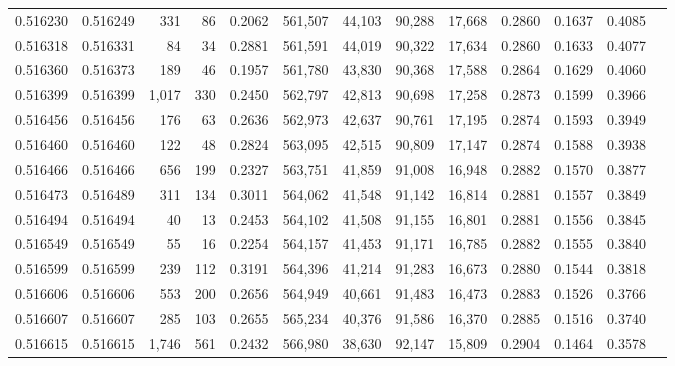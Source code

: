 \begin{tabular}{rrrrrrrrrrrrr}
0.516230 & 0.516249 &   331 &    86 &                                     0.2062 & 561,507 &  44,103 &  90,288 &  17,668 & 0.2860 & 0.1637 & 0.4085 \\
0.516318 & 0.516331 &    84 &    34 &                                     0.2881 & 561,591 &  44,019 &  90,322 &  17,634 & 0.2860 & 0.1633 & 0.4077 \\
0.516360 & 0.516373 &   189 &    46 &                                     0.1957 & 561,780 &  43,830 &  90,368 &  17,588 & 0.2864 & 0.1629 & 0.4060 \\
0.516399 & 0.516399 & 1,017 &   330 &                                     0.2450 & 562,797 &  42,813 &  90,698 &  17,258 & 0.2873 & 0.1599 & 0.3966 \\
0.516456 & 0.516456 &   176 &    63 &                                     0.2636 & 562,973 &  42,637 &  90,761 &  17,195 & 0.2874 & 0.1593 & 0.3949 \\
0.516460 & 0.516460 &   122 &    48 &                                     0.2824 & 563,095 &  42,515 &  90,809 &  17,147 & 0.2874 & 0.1588 & 0.3938 \\
0.516466 & 0.516466 &   656 &   199 &                                     0.2327 & 563,751 &  41,859 &  91,008 &  16,948 & 0.2882 & 0.1570 & 0.3877 \\
0.516473 & 0.516489 &   311 &   134 &                                     0.3011 & 564,062 &  41,548 &  91,142 &  16,814 & 0.2881 & 0.1557 & 0.3849 \\
0.516494 & 0.516494 &    40 &    13 &                                     0.2453 & 564,102 &  41,508 &  91,155 &  16,801 & 0.2881 & 0.1556 & 0.3845 \\
0.516549 & 0.516549 &    55 &    16 &                                     0.2254 & 564,157 &  41,453 &  91,171 &  16,785 & 0.2882 & 0.1555 & 0.3840 \\
0.516599 & 0.516599 &   239 &   112 &                                     0.3191 & 564,396 &  41,214 &  91,283 &  16,673 & 0.2880 & 0.1544 & 0.3818 \\
0.516606 & 0.516606 &   553 &   200 &                                     0.2656 & 564,949 &  40,661 &  91,483 &  16,473 & 0.2883 & 0.1526 & 0.3766 \\
0.516607 & 0.516607 &   285 &   103 &                                     0.2655 & 565,234 &  40,376 &  91,586 &  16,370 & 0.2885 & 0.1516 & 0.3740 \\
0.516615 & 0.516615 & 1,746 &   561 &                                     0.2432 & 566,980 &  38,630 &  92,147 &  15,809 & 0.2904 & 0.1464 & 0.3578 \\

\end{tabular}
